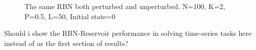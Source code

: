 \begin{figure}
  \caption{The same RBN both perturbed and unperturbed. N=100, K=2, P=0.5, L=50, Initial state=0}
\end{figure}

Should i show the RBN-Reservoir performance in solving time-series tasks here instead of as the first section of results?
